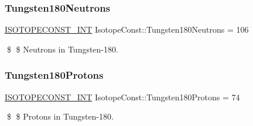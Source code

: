 \subsubsection{\texorpdfstring{Tungsten180\+Neutrons}{Tungsten180Neutrons}}
{\footnotesize\ttfamily \mbox{\hyperlink{group___isotope_const-_macros_ga5f18360b3e99483a35c32d789e62621c}{I\+S\+O\+T\+O\+P\+E\+C\+O\+N\+S\+T\+\_\+\+I\+NT}} Isotope\+Const\+::\+Tungsten180\+Neutrons = 106}

\$ \$ Neutrons in Tungsten-\/180. \mbox{\label{group___isotope_const-_tungsten-_w180_ga6e3369c52bd022909dfe80912c58bb9b}} 
\subsubsection{\texorpdfstring{Tungsten180\+Protons}{Tungsten180Protons}}
{\footnotesize\ttfamily \mbox{\hyperlink{group___isotope_const-_macros_ga5f18360b3e99483a35c32d789e62621c}{I\+S\+O\+T\+O\+P\+E\+C\+O\+N\+S\+T\+\_\+\+I\+NT}} Isotope\+Const\+::\+Tungsten180\+Protons = 74}

\$ \$ Protons in Tungsten-\/180. 